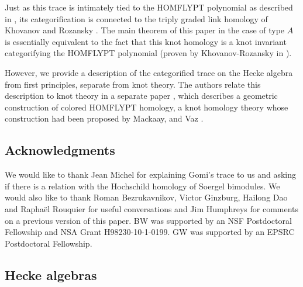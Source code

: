 \documentclass[12pt]{amsart}
\theoremstyle{remark}
\begin{document}
Just as this trace is intimately tied to the HOMFLYPT polynomial as
described in \cite{Jon87,HOMFLY}, its categorification is connected to
the triply graded link homology of Khovanov and Rozansky
\cite{Kho05,KR05,Ras06}. The main theorem of this paper in the case of
type $A$ is essentially equivalent to the fact that this knot homology
is a knot invariant categorifying the HOMFLYPT polynomial
(proven by Khovanov-Rozansky in \cite{KR05}).

However, we provide a description of
the categorified trace on the Hecke algebra from first principles,
separate from knot theory.  The authors relate this description to
knot theory in a separate paper \cite{WWcol}, which describes a
geometric construction of colored HOMFLYPT homology, a knot homology
theory whose construction had been proposed by Mackaay, \Stosic and Vaz
\cite{MSV}.

\subsection*{Acknowledgments}
\label{sec:acknowledgments}
We would like to thank Jean Michel for explaining Gomi's trace to us and asking if there is a relation with the Hochschild homology of Soergel bimodules. We would also like to thank Roman Bezrukavnikov, Victor Ginzburg, Hailong Dao and
Rapha\"el Rouquier for useful conversations and 
Jim Humphreys for comments on a previous version of this paper.
 BW was
supported by an NSF Postdoctoral Fellowship and NSA  Grant H98230-10-1-0199. GW was supported by an EPSRC Postdoctoral Fellowship.

\subsection{Hecke algebras}
\label{sec:hecke-algebras}
\end{document}
